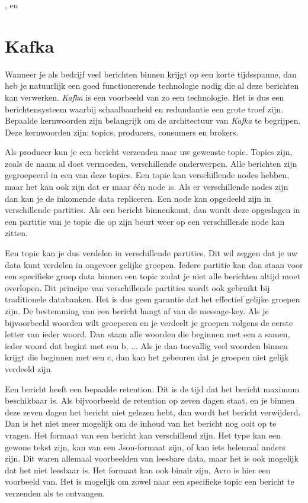  \autocite{Claudio2017}, \autocite{Velthoven2016} en \autocite{Xu2019}

\section{Kafka}

Wanneer je als bedrijf veel berichten binnen krijgt op een korte tijdsspanne, dan heb je natuurlijk een goed functionerende technologie nodig die al deze berichten kan verwerken. \emph{Kafka} is een voorbeeld van zo een technologie. Het is dus een berichtensysteem waarbij schaalbaarheid en redundantie een grote troef zijn. Bepaalde kernwoorden zijn belangrijk om de architectuur van \emph{Kafka} te begrijpen. Deze kernwoorden zijn: topics, producers, consumers en brokers.  

Als producer kun je een bericht verzenden naar uw gewenste topic. Topics zijn, zoals de naam al doet vermoeden, verschillende onderwerpen. Alle berichten zijn gegroepeerd in een van deze topics. Een topic kan verschillende nodes hebben, maar het kan ook zijn dat er maar één node is. Als er verschillende nodes zijn dan kan je de inkomende data repliceren. Een node kan opgedeeld zijn in verschillende partities. Als een bericht binnenkomt, dan wordt deze opgeslagen in een partitie van je topic die op zijn beurt weer op een verschillende node kan zitten.

Een topic kan je dus verdelen in verschillende partities. Dit wil zeggen dat je uw data kunt verdelen in ongeveer gelijke groepen. Iedere partitie kan dan staan voor een specifieke groep data binnen een topic zodat je niet alle berichten altijd moet overlopen. Dit principe van verschillende partities wordt ook gebruikt bij traditionele databanken. Het is dus geen garantie dat het effectief gelijke groepen zijn. De bestemming van een bericht hangt af van de message-key. Als je bijvoorbeeld woorden wilt groeperen en je verdeelt je groepen volgens de eerste letter van ieder woord. Dan staan alle woorden die beginnen met een a samen, ieder woord dat begint met een b, ... Als je dan toevallig veel woorden binnen krijgt die beginnen met een c, dan kan het gebeuren dat je groepen niet gelijk verdeeld zijn.

Een bericht heeft een bepaalde retention. Dit is de tijd dat het bericht maximum beschikbaar is. Als bijvoorbeeld de retention op zeven dagen staat, en je binnen deze zeven dagen het bericht niet gelezen hebt, dan wordt het bericht verwijderd. Dan is het niet meer mogelijk om de inhoud van het bericht nog ooit op te vragen. Het formaat van een bericht kan verschillend zijn. Het type kan een gewone tekst zijn, kan van een Json-formaat zijn, of kan iets helemaal anders zijn. Dit waren allemaal voorbeelden van leesbare data, maar het is ook mogelijk dat het niet leesbaar is. Het formaat kan ook binair zijn, Avro is hier een voorbeeld van. Het is mogelijk om zowel naar een specifieke topic een bericht te verzenden als te ontvangen. 

